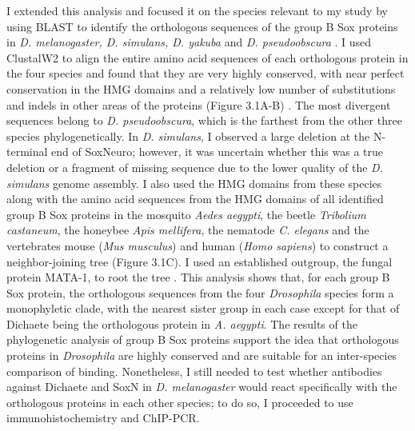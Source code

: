 I extended this analysis and focused it on the species relevant to my study by using BLAST to identify the orthologous sequences of the group B Sox proteins in \emph{D. melanogaster, D. simulans, D. yakuba} and \emph{D. pseudoobscura} \citep{altschul_basic_1990}. I used ClustalW2 to align the entire amino acid sequences of each orthologous protein in the four species and found that they are very highly conserved, with near perfect conservation in the HMG domains and a relatively low number of substitutions and indels in other areas of the proteins (Figure 3.1A-B) \citep{chenna_multiple_2003}. The most divergent sequences belong to \emph{D. pseudoobscura}, which is the farthest from the other three species phylogenetically. In \emph{D. simulans}, I observed a large deletion at the N-terminal end of SoxNeuro; however, it was uncertain whether this was a true deletion or a fragment of missing sequence due to the lower quality of the \emph{D. simulans} genome assembly. I also used the HMG domains from these species along with the amino acid sequences from the HMG domains of all identified group B Sox proteins in the mosquito \emph{Aedes aegypti}, the beetle \emph{Tribolium castaneum}, the honeybee \emph{Apis mellifera}, the nematode \emph{C. elegans} and the vertebrates mouse (\emph{Mus musculus}) and human (\emph{Homo sapiens}) to construct a neighbor-joining tree (Figure 3.1C). I used an established outgroup, the fungal protein MATA-1, to root the tree \citep{laudet_ancestry_1993}. This analysis shows that, for each group B Sox protein, the orthologous sequences from the four \emph{Drosophila} species form a monophyletic clade, with the nearest sister group in each case except for that of Dichaete being the orthologous protein in \emph{A. aegypti}. The results of the phylogenetic analysis of group B Sox proteins support the idea that orthologous proteins in \emph{Drosophila} are highly conserved and are suitable for an inter-species comparison of binding. Nonetheless, I still needed to test whether antibodies against Dichaete and SoxN in \emph{D. melanogaster} would react specifically with the orthologous proteins in each other species; to do so, I proceeded to use immunohistochemistry and ChIP-PCR.

